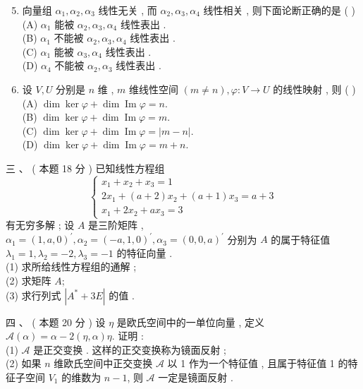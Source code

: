 \documentclass[10pt]{article}
\begin{document}
{\begin{enumerate}
  \setcounter{enumi}{4}
  \item  向量组  $\alpha_{1}, \alpha_{2}, \alpha_{3}$  线性无关 ,  而  $\alpha_{2}, \alpha_{3}, \alpha_{4}$  线性相关 ,  则下面论断正确的是 ( )\\
(A) $\alpha_{1}$  能被  $\alpha_{2}, \alpha_{3}, \alpha_{4}$  线性表出 .\\
(B) $\alpha_{1}$  不能被  $\alpha_{2}, \alpha_{3}, \alpha_{4}$  线性表出 .\\
(C) $\alpha_{1}$  能被  $\alpha_{3}, \alpha_{4}$  线性表出 .\\
(D) $\alpha_{4}$  不能被  $\alpha_{2}, \alpha_{3}$  线性表出 .

  \item  设  $V, U$  分别是  $n$  维 , $m$  维线性空间  $(m \neq n), \varphi: V \rightarrow U$  的线性映射 ,  则 ( )\\
(A) $\operatorname{dim} \operatorname{ker} \varphi+\operatorname{dim} \operatorname{Im} \varphi=n$.\\
(B) $\operatorname{dim} \operatorname{ker} \varphi+\operatorname{dim} \operatorname{Im} \varphi=m$.\\
(C) $\operatorname{dim} \operatorname{ker} \varphi+\operatorname{dim} \operatorname{Im} \varphi=|m-n|$.\\
(D) $\operatorname{dim} \operatorname{ker} \varphi+\operatorname{dim} \operatorname{Im} \varphi=m+n$.

\end{enumerate}
 三 、 ( 本题  18  分 )  已知线性方程组 
$$
\left\{\begin{array}{l}
x_{1}+x_{2}+x_{3}=1 \\
2 x_{1}+(a+2) x_{2}+(a+1) x_{3}=a+3 \\
x_{1}+2 x_{2}+a x_{3}=3
\end{array}\right.
$$
 有无穷多解 ;  设  $A$  是三阶矩阵 , $\alpha_{1}=(1, a, 0)^{\prime}, \alpha_{2}=(-a, 1,0)^{\prime}, \alpha_{3}=(0,0, a)^{\prime}$  分别为  $A$  的属于特征值  $\lambda_{1}=1, \lambda_{2}=-2, \lambda_{3}=-1$  的特征向量 .\\
(1)  求所给线性方程组的通解 ;\\
(2)  求矩阵  $A$;\\
(3)  求行列式  $\left|A^{*}+3 E\right|$  的值 .

 四 、 ( 本题  20  分 )  设  $\eta$  是欧氏空间中的一单位向量 ,  定义  $\mathscr{A}(\alpha)=\alpha-2(\eta, \alpha) \eta$.  证明 :\\
(1) $\mathscr{A}$  是正交变换 .  这样的正交变换称为镜面反射 ;\\
(2)  如果  $n$  维欧氏空间中正交变换  $\mathscr{A}$  以  1  作为一个特征值 ,  且属于特征值  1  的特征子空间  $V_{1}$  的维数为  $n-1$,  则  $\mathscr{A}$  一定是镜面反射 .

}
\end{document}
